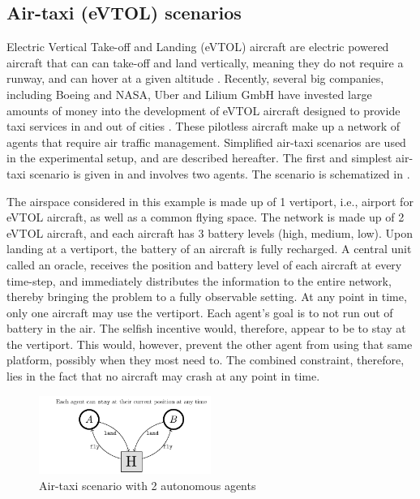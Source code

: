 \subsection{Air-taxi (eVTOL) scenarios}
Electric Vertical Take-off and Landing (eVTOL) aircraft are electric powered aircraft that can can take-off and land vertically, meaning they do not require a runway, and can hover at a given altitude \cite{vtol,vtol56}. Recently, several big companies, including Boeing and NASA, Uber and Lilium GmbH have invested large amounts of money into the development of eVTOL aircraft designed to provide taxi services in and out of cities \cite{vtol2, vtol3}.
These pilotless aircraft make up a network of agents that require air traffic management. Simplified air-taxi scenarios are used in the experimental setup, and are described hereafter.
The first and simplest air-taxi scenario is given in  and involves two agents. The scenario is schematized in .
\begin{example}
\label{ex:air1}
The airspace considered in this example is made up of 1 vertiport, i.e., airport for eVTOL aircraft, as well as a common flying space. The network is made up of 2 eVTOL aircraft, and each aircraft has 3 battery levels (high, medium, low). Upon landing at a vertiport, the battery of an aircraft is fully recharged. A central unit called an oracle, receives the position and battery level of each aircraft at every time-step, and immediately distributes the information to the entire network, thereby bringing the problem to a fully observable setting. At any point in time, only one aircraft may use the vertiport. Each agent's goal is to not run out of battery in the air. The selfish incentive would, therefore, appear to be to stay at the vertiport. This would, however, prevent the other agent from using that same platform, possibly when they most need to. The combined constraint, therefore, lies in the fact that no aircraft may crash at any point in time.
\end{example}

\begin{figure}[h]
  \begin{center}
    \includegraphics[width=0.5\textwidth]{images/MasterThesisVTOL2agDraw (2).pdf}
  \end{center}
  \caption{Air-taxi scenario with 2 autonomous agents}\label{fig:ex3}
\end{figure}



